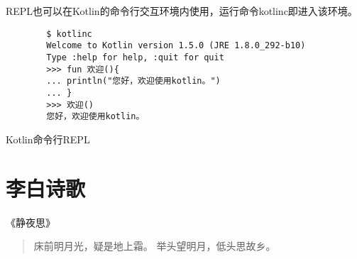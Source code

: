 REPL也可以在Kotlin的命令行交互环境内使用，运行命令kotlinc即进入该环境。
\begin{listing}[H]
    \begin{verbatim}
        $ kotlinc
        Welcome to Kotlin version 1.5.0 (JRE 1.8.0_292-b10)
        Type :help for help, :quit for quit
        >>> fun 欢迎(){
        ... println("您好，欢迎使用kotlin。")
        ... }
        >>> 欢迎()
        您好，欢迎使用kotlin。
\end{verbatim}
\caption{Kotlin命令行REPL}
\label{lst:Kotlin命令行}
\end{listing}

\section{李白诗歌}

《静夜思》\citep{李白:静夜思}
\begin{verse}
床前明月光，疑是地上霜。
举头望明月，低头思故乡。    
\end{verse}
 




